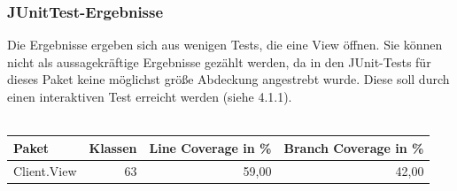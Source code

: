 \documentclass[a4paper]{article}
\begin{document}
\subsubsection{JUnitTest-Ergebnisse}
Die Ergebnisse ergeben sich aus wenigen Tests, die eine View öffnen. Sie können nicht als aussagekräftige Ergebnisse gezählt werden, da in den JUnit-Tests für dieses Paket keine möglichst größe Abdeckung angestrebt wurde. Diese soll durch einen interaktiven Test erreicht werden (siehe 4.1.1).
\ \\ \ \\

\noindent
\begin{tabular}{|l|r|r|r|}
\hline
Paket & Klassen & Line Coverage in \% & Branch Coverage in \% \\ \hline \hline
Client.View & 63 & 59,00 & 42,00 \\ \hline
\end{tabular}

\ \\
\end{document}
